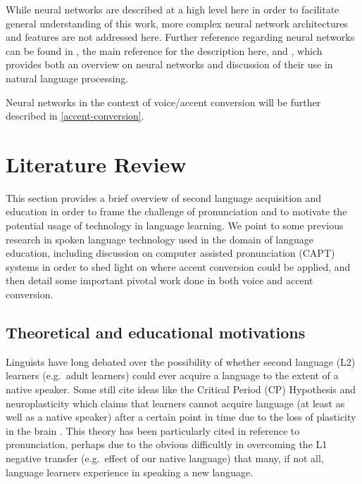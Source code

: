\documentclass
[
    a4paper,
    twoside,
    12pt,
]
{report}
\begin{document}
While neural networks are described at a high level here in order to
facilitate general understanding of this work, more complex neural
network architectures and features are not addressed here. Further
reference regarding neural networks can be found in
\textcite{nielsen2015}, the main reference for the description here, and
\textcite{goldberg2017}, which provides both an overview on neural
networks and discussion of their use in natural language processing.

Neural networks in the context of voice/accent conversion will be
further described in \autoref{accent-conversion}.
\cleardoublepage
\chapter{Literature Review}

This section provides a brief overview of second language acquisition
and education in order to frame the challenge of pronunciation and to
motivate the potential usage of technology in language learning. We
point to some previous research in spoken language technology used in
the domain of language education, including discussion on computer
assisted pronunciation (CAPT) systems in order to shed light on where
accent conversion could be applied, and then detail some important
pivotal work done in both voice and accent conversion.

\hypertarget{theoretical-and-educational-motivations}{%
\section{Theoretical and educational
motivations}\label{theoretical-and-educational-motivations}}

Linguists have long debated over the possibility of whether second
language (L2) learners (e.g.~adult learners) could ever acquire a
language to the extent of a native speaker. Some still cite ideas like
the Critical Period (CP) Hypothesis and neuroplasticity which claims
that learners cannot acquire language (at least as well as a native
speaker) after a certain point in time due to the loss of plasticity in
the brain \parencite{lenneberg1967a,scovel1988a}. This theory has been
particularly cited in reference to pronunciation, perhaps due to the
obvious difficultly in overcoming the L1 negative transfer (e.g.~effect
of our native language) that many, if not all, language learners
experience in speaking a new language.
\end{document}
